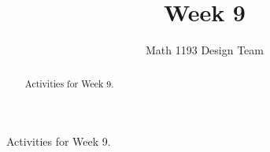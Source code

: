 \documentclass[noauthor]{ximera}
\title{Week 9}
\author{Math 1193 Design Team}
\begin{document}
\begin{abstract}
    Activities for Week 9.
\end{abstract}
\maketitle

Activities for Week 9.
\end{document}
